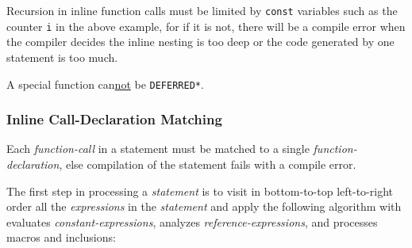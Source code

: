 \documentclass[12pt]{article}
\begin{document}
Recursion in inline function calls must be limited by {\tt const}
variables such as the counter {\tt i} in the above example,
for if it is not, there
will be a compile error when the compiler decides the inline nesting
is too deep or the code generated by one statement is too much.

A special function can\underline{not} be {\tt *DEFERRED*}.

\subsubsection{Inline Call-Declaration Matching}
\label{INLINE-CALL-DECLARATION-MATCHING}

Each {\em function-call} in a statement must be matched to a single
{\em function-declaration}, else compilation of the statement fails
with a compile error.

The first step in processing
a {\em statement} is to visit in bottom-to-top left-to-right order
all the {\em expressions} in the {\em statement} and apply the following
algorithm with evaluates {\em constant-expressions}, analyzes
{\em reference-expressions}, and processes macros and inclusions:

\bigskip
\end{document}
